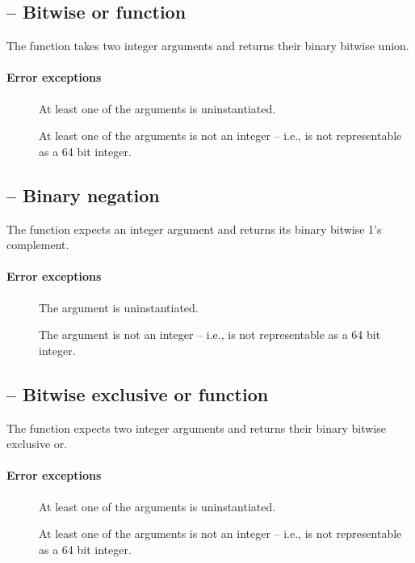 \subsection{ -- Bitwise or function}
The  function takes two integer arguments and returns their binary bitwise union.
        
\paragraph{Error exceptions}
\begin{description}
\item[]
At least one of the arguments is uninstantiated.
\item[]
At least one of the arguments is not an integer -- i.e., is not representable as a 64 bit integer.
\end{description}

\subsection{ -- Binary negation}
The  function expects an integer argument and returns its binary bitwise 1's complement.
        
\paragraph{Error exceptions}
\begin{description}
\item[]
The argument is uninstantiated.
\item[]
The argument is not an integer -- i.e., is not representable as a 64 bit integer.
\end{description}
      
\subsection{ -- Bitwise exclusive or function}
The  function expects two integer arguments and returns their binary bitwise exclusive or.
        
\paragraph{Error exceptions}
\begin{description}
\item[]
At least one of the arguments is uninstantiated.
\item[]
At least one of the arguments is not an integer -- i.e., is not representable as a 64 bit integer.
\end{description}
      
